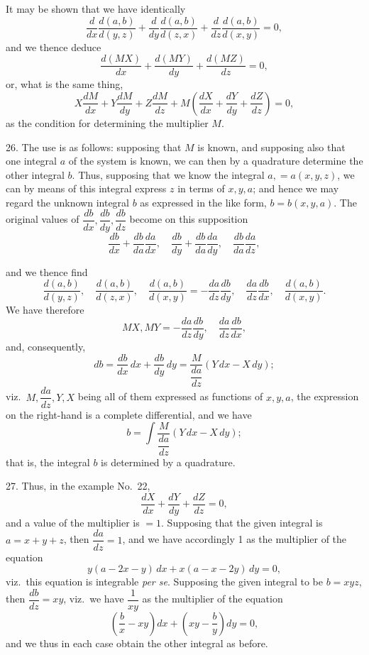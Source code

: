 \documentclass[11pt,a4paper]{article}
\begin{document}
It may be shown that we have identically
\[
\frac{d}{dx}\frac{d(a, b)}{d(y, z)} + \frac{d}{dy}\frac{d(a, b)}{d(z, x)} + \frac{d}{dz}\frac{d(a, b)}{d(x, y)} = 0,
\]
and we thence deduce
\[
\frac{d(MX)}{dx} + \frac{d(MY)}{dy} + \frac{d(MZ)}{dz} = 0,
\]
or, what is the same thing,
\[
X\frac{dM}{dx} + Y\frac{dM}{dy} + Z\frac{dM}{dz} + M\!\left(\frac{dX}{dx} + \frac{dY}{dy} + \frac{dZ}{dz}\right) = 0,
\]
as the condition for determining the multiplier $M$.

26. The use is as follows: supposing that $M$ is known, and supposing also that one integral $a$ of the system is known, we can then by a quadrature determine the other integral $b$. Thus, supposing that we know the integral $a, = a(x, y, z)$, we can by means of this integral express $z$ in terms of $x, y, a$; and hence we may regard the unknown integral $b$ as expressed in the like form, $b = b(x, y, a)$. The original values of $\dfrac{db}{dx}, \dfrac{db}{dy}, \dfrac{db}{dz}$ become on this supposition
\[
\frac{db}{dx} + \frac{db}{da}\frac{da}{dx}, \quad \frac{db}{dy} + \frac{db}{da}\frac{da}{dy}, \quad \frac{db}{da}\frac{da}{dz},
\]

\newpage


and we thence find
\[
\frac{d(a, b)}{d(y, z)}, \quad \frac{d(a, b)}{d(z, x)}, \quad \frac{d(a, b)}{d(x, y)} = -\frac{da}{dz}\frac{db}{dy}, \quad \frac{da}{dz}\frac{db}{dx}, \quad \frac{d(a, b)}{d(x, y)}.
\]
We have therefore
\[
MX, MY = -\frac{da}{dz}\frac{db}{dy}, \quad \frac{da}{dz}\frac{db}{dx},
\]
and, consequently,
\[
db = \frac{db}{dx}\,dx + \frac{db}{dy}\,dy = \frac{M}{\dfrac{da}{dz}}(Y\,dx - X\,dy);
\]
viz.\ $M, \dfrac{da}{dz}, Y, X$ being all of them expressed as functions of $x, y, a$, the expression on the right-hand is a complete differential, and we have
\[
b = \int \frac{M}{\dfrac{da}{dz}}(Y\,dx - X\,dy);
\]
that is, the integral $b$ is determined by a quadrature.

27. Thus, in the example No.~22,
\[
\frac{dX}{dx} + \frac{dY}{dy} + \frac{dZ}{dz} = 0,
\]
and a value of the multiplier is $= 1$. Supposing that the given integral is $a = x + y + z$, then $\dfrac{da}{dz} = 1$, and we have accordingly 1 as the multiplier of the equation
\[
y(a - 2x - y)\,dx + x(a - x - 2y)\,dy = 0,
\]
viz.\ this equation is integrable \emph{per se}. Supposing the given integral to be $b = xyz$, then $\dfrac{db}{dz} = xy$, viz.\ we have $\dfrac{1}{xy}$ as the multiplier of the equation
\[
\left(\frac{b}{x} - xy\right) dx + \left(xy - \frac{b}{y}\right) dy = 0,
\]
and we thus in each case obtain the other integral as before.
\end{document}
